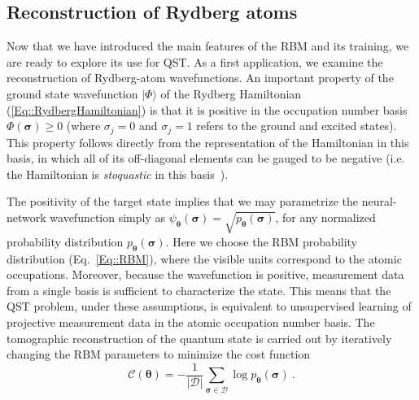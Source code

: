 \documentclass[twocolumn,english,reprint,superscriptaddress,longbibliography,pra]{revtex4-1}
\begin{document}
\subsection{Reconstruction of Rydberg atoms}
Now that we have introduced the main features of the RBM and its training, we are ready to explore its use for QST. As a first application, we examine the reconstruction of Rydberg-atom wavefunctions. An important property of the ground state wavefunction $|\Phi\rangle$ of the Rydberg Hamiltonian (\ref{Eq::RydbergHamiltonian}) is that it is positive in the occupation number basis $\Phi(\bm\sigma)\ge0$ (where $\sigma_j=0$ and $\sigma_j=1$ refers to the ground and excited states). This property follows directly from the representation of the Hamiltonian in this basis, in which all of its off-diagonal elements can be gauged to be negative (i.e. the Hamiltonian is {\it stoquastic} in this basis~\cite{Bravyi2006}). 

The positivity of the target state implies that we may parametrize the neural-network wavefunction simply as $\psi_{\bm\theta}(\bm\sigma) = \sqrt{p_{\bm\theta}(\bm\sigma)}$, for any normalized probability distribution $p_{\bm\theta}(\bm\sigma)$. Here we choose the RBM probability distribution (Eq.~\ref{Eq::RBM}), where the visible units correspond to the atomic occupations. Moreover, because the wavefunction is positive, measurement data from a single basis is sufficient to characterize the state. This means that the QST problem, under these assumptions, is equivalent to unsupervised learning of projective measurement data in the atomic occupation number basis. The tomographic reconstruction of the quantum state is carried out by iteratively changing the RBM parameters to minimize the cost function
\begin{equation}
\mathcal{C}(\bm{\theta})=
-\frac{1}{|\mathcal{D}|}\sum_{\bm{\sigma}\in\mathcal{D}}\log p_{\bm\theta}(\bm\sigma)\:.
\label{Eq::KL}
\end{equation}
\end{document}
